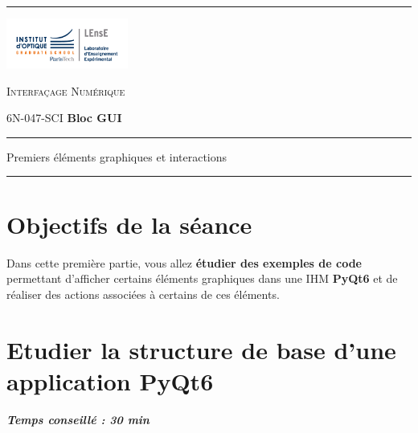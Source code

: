\documentclass[a4paper,11pt,titlepage]{article} %
\begin{document}
	
\noindent \rule{\linewidth}{1pt}

\newpage
\strut %

\begin{minipage}[c]{.25\linewidth}
	\includegraphics[width=4cm]{images/Logo-LEnsE.png}
\end{minipage} \hfill
\begin{minipage}[c]{.4\linewidth}

\begin{center}
\vspace{0.3cm}
{\Large \textsc{Interfaçage Numérique}}

\medskip

6N-047-SCI \qquad \textbf{\Large Bloc GUI}

\end{center}
\end{minipage}\hfill

\vspace{0.5cm}

\noindent \rule{\linewidth}{1pt}

{\noindent\Large \rule[-7pt]{0pt}{30pt} Premiers éléments graphiques et interactions} 

\noindent \rule{\linewidth}{1pt}


\section{Objectifs de la séance}

Dans cette première partie, vous allez \textbf{étudier des exemples de code} permettant d'afficher certains éléments graphiques dans une IHM \textbf{PyQt6} et de réaliser des actions associées à certains de ces éléments. 


\section{Etudier la structure de base d'une application PyQt6}

\begin{center} \textbf{\textit{Temps conseillé : 30 min}} \end{center}
\end{document}
